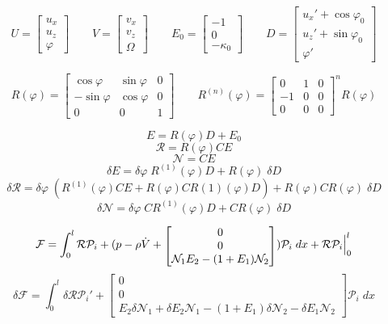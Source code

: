 \documentclass{article}
\begin{document}
$$U = 
\begin{bmatrix}
	u_x\\
	u_z\\
	\varphi
\end{bmatrix} \qquad V = 
\begin{bmatrix}
	v_x\\
	v_z\\
	\Omega
\end{bmatrix} \qquad E_0=
\begin{bmatrix}
	-1\\
	0\\
	-\kappa_0
\end{bmatrix} \qquad D = 
\begin{bmatrix}
	u_x' + \cos\varphi_0\\
	u_z' + \sin\varphi_0\\
	\varphi'
\end{bmatrix}
$$


$$R(\varphi) =
\begin{bmatrix}
	\cos\varphi & \sin \varphi & 0\\
	-\sin\varphi & \cos\varphi & 0\\
	0 & 0 & 1
\end{bmatrix} \qquad R^{(n)}(\varphi) = 
\begin{bmatrix}
	0 & 1 & 0\\
	-1 & 0 & 0\\
	0 & 0 & 0
\end{bmatrix}^n R(\varphi)
$$


$$E = R(\varphi)D+E_0$$
$$\mathcal{R} = R(\varphi)CE$$
$$\mathcal{N} = CE$$
$$\delta E = \delta\varphi\;R^{(1)}(\varphi)D + R(\varphi)\;\delta D$$
$$\delta \mathcal{R} = \delta\varphi\;(R^{(1)}(\varphi)CE+R(\varphi)CR{(1)}(\varphi)D) +  R(\varphi)CR(\varphi)\;\delta D$$
$$\delta \mathcal{N} = \delta\varphi\;CR^{(1)}(\varphi)D +  CR(\varphi)\;\delta D$$


$$\mathcal{F} = \int_0^l\mathcal{R}\mathcal{P}_i + (p-\rho \dot{V} + {\scriptscriptstyle \begin{bmatrix} 0\\ 0\\ \mathcal{N}_1E_2 - (1+E_1) \mathcal{N}_2 \end{bmatrix}}) \mathcal{P}_i \; dx + \mathcal{R}\mathcal{P}_i\Bigl |_0^l$$
	$$\delta \mathcal{F} = \int_0^l \delta \mathcal{RP}_i' + {\scriptscriptstyle \begin{bmatrix} 0\\ 0\\ E_2\delta\mathcal{N}_1+\delta E_2 \mathcal{N}_1-(1+E_1)\delta \mathcal{N}_2 - \delta E_1 \mathcal{N}_2 \end{bmatrix}}\mathcal{P}_i\; dx$$
\end{document}
